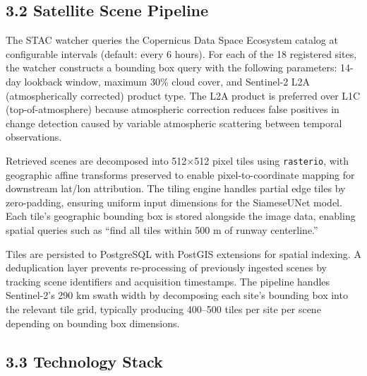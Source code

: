 \documentclass[11pt,a4paper]{article}
\begin{document}
\hypertarget{satellite-scene-pipeline}{%
\subsection{3.2 Satellite Scene Pipeline}\label{satellite-scene-pipeline}}

The STAC watcher queries the Copernicus Data Space Ecosystem catalog at configurable intervals (default: every 6 hours). For each of the 18 registered sites, the watcher constructs a bounding box query with the following parameters: 14-day lookback window, maximum 30\% cloud cover, and Sentinel-2 L2A (atmospherically corrected) product type. The L2A product is preferred over L1C (top-of-atmosphere) because atmospheric correction reduces false positives in change detection caused by variable atmospheric scattering between temporal observations.

Retrieved scenes are decomposed into 512×512 pixel tiles using \texttt{rasterio}, with geographic affine transforms preserved to enable pixel-to-coordinate mapping for downstream lat/lon attribution. The tiling engine handles partial edge tiles by zero-padding, ensuring uniform input dimensions for the SiameseUNet model. Each tile's geographic bounding box is stored alongside the image data, enabling spatial queries such as ``find all tiles within 500 m of runway centerline.''

Tiles are persisted to PostgreSQL with PostGIS extensions for spatial indexing. A deduplication layer prevents re-processing of previously ingested scenes by tracking scene identifiers and acquisition timestamps. The pipeline handles Sentinel-2's 290 km swath width by decomposing each site's bounding box into the relevant tile grid, typically producing 400--500 tiles per site per scene depending on bounding box dimensions.

\hypertarget{technology-stack}{%
\subsection{3.3 Technology Stack}\label{technology-stack}}
\end{document}
